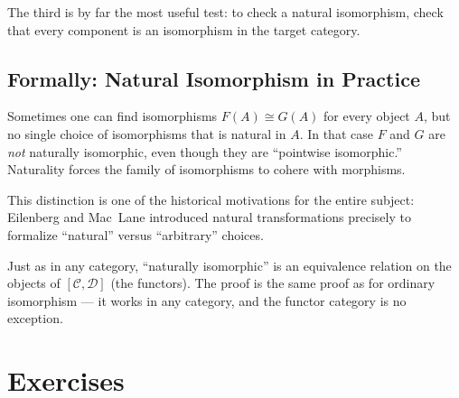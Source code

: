 The third is by far the most useful test: to check a natural isomorphism,
check that every component is an isomorphism in the target category.

\subsection{Formally: Natural Isomorphism in Practice}

Sometimes one can find isomorphisms $F(A) \cong G(A)$ for every object
$A$, but no single choice of isomorphisms that is natural in $A$. In that
case $F$ and $G$ are \emph{not} naturally isomorphic, even though they are
``pointwise isomorphic.'' Naturality forces the family of isomorphisms to
cohere with morphisms.

This distinction is one of the historical motivations for the entire
subject: Eilenberg and Mac~Lane introduced natural transformations
precisely to formalize ``natural'' versus ``arbitrary'' choices.

Just as in any category, ``naturally isomorphic'' is an equivalence
relation on the objects of $[\mathcal{C}, \mathcal{D}]$ (the functors). The
proof is the same proof as for ordinary isomorphism --- it works in any
category, and the functor category is no exception.


\section*{Exercises}

